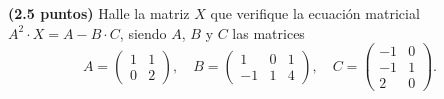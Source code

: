 
\textbf{(2.5 puntos)} Halle la matriz $X$ que verifique la ecuación matricial $A^2\cdot X=A-B\cdot C$, siendo $A$, $B$ y $C$ las matrices
\[
A=\begin{pmatrix}1&1\\0&2\end{pmatrix},\quad
B=\begin{pmatrix}1&0&1\\-1&1&4\end{pmatrix},\quad
C=\begin{pmatrix}-1&0\\-1&1\\2&0\end{pmatrix}.
\]
